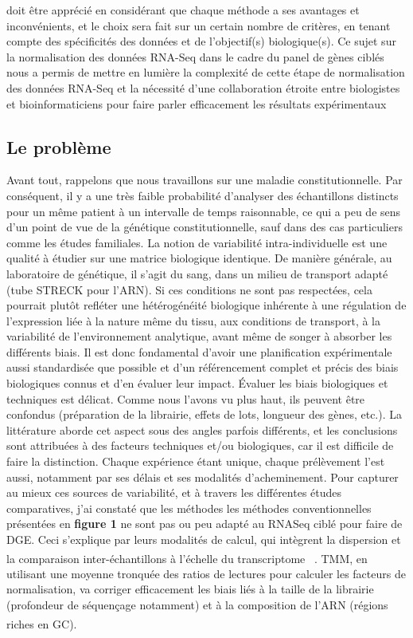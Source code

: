  doit être apprécié en considérant que chaque méthode a ses avantages et inconvénients, et le choix sera fait sur un certain nombre de critères,
  en tenant compte des spécificités des données et de l'objectif(s) biologique(s). Ce sujet sur la normalisation des données RNA-Seq dans le cadre du panel de gènes ciblés
   nous a permis de mettre en lumière la complexité de cette étape de normalisation des données RNA-Seq et la nécessité d'une collaboration étroite entre biologistes et bioinformaticiens 
   pour faire parler efficacement les résultats expérimentaux 


\subsection{Le problème}

Avant tout, rappelons que nous travaillons sur une maladie constitutionnelle. Par conséquent, il y a une très faible probabilité d'analyser des échantillons distincts pour un même patient à un intervalle de temps raisonnable, ce qui a peu de sens d'un point de vue de la génétique constitutionnelle, sauf dans des cas particuliers comme les études familiales. La notion de variabilité intra-individuelle est une qualité à étudier sur une matrice biologique identique. De manière générale, au laboratoire de génétique, il s'agit du sang, dans un milieu de transport adapté (tube STRECK pour l'ARN). Si ces conditions ne sont pas respectées, cela pourrait plutôt refléter une hétérogénéité biologique inhérente à une régulation de l'expression liée à la nature même du tissu, aux conditions de transport, à la variabilité de l'environnement analytique, avant même de songer à absorber les différents biais.
Il est donc fondamental d'avoir une planification expérimentale aussi standardisée que possible et d'un référencement complet et précis des biais biologiques connus et d'en évaluer leur impact.
Évaluer les biais biologiques et techniques est délicat. Comme nous l'avons vu plus haut, ils peuvent être confondus (préparation de la librairie, effets de lots, longueur des gènes, etc.).
La littérature aborde cet aspect sous des angles parfois différents, et les conclusions sont attribuées à des facteurs techniques et/ou biologiques, car il est difficile de faire la distinction. 
 Chaque expérience étant unique, chaque prélèvement l'est aussi, notamment par ses délais et ses modalités d'acheminement. Pour capturer au mieux ces sources de variabilité, et à travers les différentes études comparatives, 
 j'ai constaté que les méthodes les méthodes conventionnelles présentées en \textbf{figure 1} ne sont pas ou peu adapté au RNASeq ciblé pour faire de DGE. Ceci s'explique par leurs modalités de calcul, qui intègrent la dispersion et la comparaison inter-échantillons à l'échelle du transcriptome ~\textsuperscript{\cite{dillies_comprehensive_2013}}. TMM, en utilisant une moyenne tronquée des ratios de lectures pour calculer les facteurs de normalisation,
  va corriger efficacement les biais liés à la taille de la librairie (profondeur de séquençage notamment) et à la composition de l'ARN (régions riches en GC)\textsuperscript{\cite{abrams_protocol_2019}}.
 

